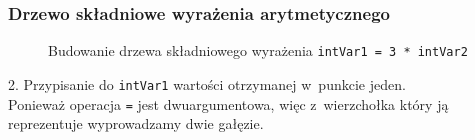 \documentclass[10pt,t]{beamer}
\begin{document}
\begin{frame}
  \frametitle{Drzewo składniowe wyrażenia arytmetycznego}


  \begin{figure}


    \caption{Budowanie drzewa składniowego wyrażenia
      \texttt{intVar1 = 3 * intVar2}}

    \label{fig:Scheme-of-CPU}

  \end{figure}





  2. Przypisanie do \texttt{intVar1} wartości otrzymanej w~punkcie jeden. \\
  Ponieważ operacja \texttt{=} jest dwuargumentowa, więc z~wierzchołka
  który ją reprezentuje wyprowadzamy dwie gałęzie.

\end{frame}
\end{document}
